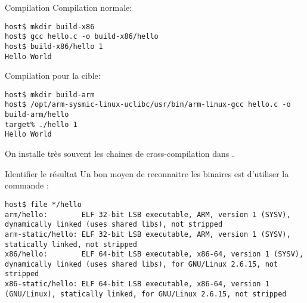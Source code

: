 \begin{frame}[fragile=singleslide]{Compilation}
  Compilation normale:
\begin{lstlisting}
host$ mkdir build-x86
host$ gcc hello.c -o build-x86/hello
host$ build-x86/hello 1
Hello World
\end{lstlisting} %
  Compilation pour la cible:
\begin{lstlisting}
host$ mkdir build-arm
host$ /opt/arm-sysmic-linux-uclibc/usr/bin/arm-linux-gcc hello.c -o build-arm/hello
target% ./hello 1
Hello World
\end{lstlisting} %
  On  installe  très souvent  les  chaines  de cross-compilation  dans
  .
\end{frame}

\begin{frame}[fragile=singleslide]{Identifier le résultat}
  Un bon moyen de reconnaitre  les binaires est d'utiliser la commande
  :
\begin{lstlisting}
host$ file */hello
arm/hello:        ELF 32-bit LSB executable, ARM, version 1 (SYSV), dynamically linked (uses shared libs), not stripped
arm-static/hello: ELF 32-bit LSB executable, ARM, version 1 (SYSV), statically linked, not stripped
x86/hello:        ELF 64-bit LSB executable, x86-64, version 1 (SYSV), dynamically linked (uses shared libs), for GNU/Linux 2.6.15, not stripped
x86-static/hello: ELF 64-bit LSB executable, x86-64, version 1 (GNU/Linux), statically linked, for GNU/Linux 2.6.15, not stripped
\end{lstlisting} %
\end{frame}


